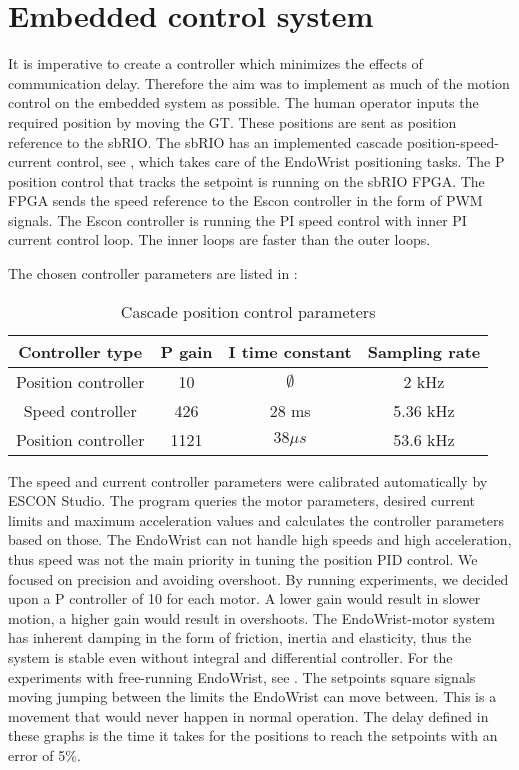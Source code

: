 \section{Embedded control system}



It is imperative to create a controller which minimizes the effects of communication delay. Therefore the aim was to implement as much of the motion control on the embedded system as possible. The human operator  inputs the required position by moving the GT. These positions are sent as position reference to the sbRIO. 
The sbRIO has an implemented cascade position-speed-current control, see , which takes care of the EndoWrist positioning tasks. The P position control that tracks the setpoint is running on the sbRIO FPGA. The FPGA sends the speed reference to the Escon controller in the form of PWM signals. The Escon controller is running the PI speed control with inner PI current control loop. The inner loops are faster than the outer loops.

The chosen controller parameters are listed in :

\begin{center}
	\begin{table}[h]
	\begin{tabular}{ c | c | c | c }
		\hline
		Controller type & P gain & I time constant & Sampling rate \\ \hline
		Position controller & 10 & $\emptyset$ & 2 kHz \\ \hline
		Speed controller & 426 & 28 ms & 5.36 kHz \\ \hline
		Position controller & 1121 & $38 \mu s$ & 53.6 kHz \\ \hline
		
	\end{tabular}
	\caption{Cascade position control parameters}
	\label{tab:control_param}
	\end{table}
\end{center}

The speed and current controller parameters were calibrated automatically by ESCON Studio. The program queries the motor parameters, desired current limits and maximum acceleration values and calculates the controller parameters based on those. The EndoWrist can not handle high speeds and high acceleration, thus speed was not the main priority in tuning the position PID control. We focused on precision and avoiding overshoot. By running experiments, we decided upon a P controller of 10 for each motor. A lower gain would result in slower motion, a higher gain would result in overshoots. The EndoWrist-motor system has inherent damping in the form of friction, inertia and elasticity, thus the system is stable even without integral and differential controller. For the experiments with free-running EndoWrist, see . The setpoints square signals moving jumping between the limits the EndoWrist can move between. This is a movement that would never happen in normal operation. The delay defined in these graphs is the time it takes for the positions to reach the setpoints with an error of 5\%.

